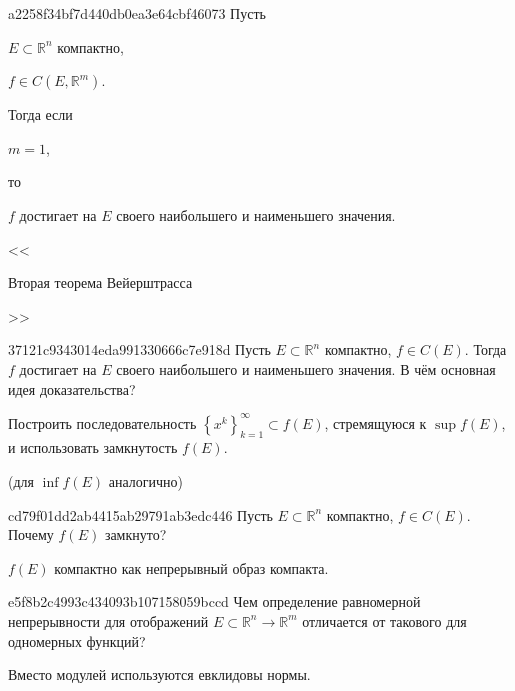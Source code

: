 \begin{note}{a2258f34bf7d440db0ea3e64cbf46073}
    Пусть \begin{icloze}{3}\({ E \subset \mathbb R^{n} }\) компактно,\end{icloze}\: \begin{icloze}{4}\({ f \in C(E, \mathbb R^{m}) }\).\end{icloze}
    Тогда если \begin{icloze}{2}\({ m = 1 }\),\end{icloze} то \begin{icloze}{1}\({ f }\) достигает на \({ E }\) своего наибольшего и наименьшего значения.\end{icloze}

    \begin{center}
        \tiny
        <<\begin{icloze}{5}Вторая теорема Вейерштрасса\end{icloze}>>
    \end{center}
\end{note}

\begin{note}{37121c9343014eda991330666c7e918d}
    Пусть \({ E \subset \mathbb R^{n} }\) компактно,\: \({ f \in C(E) }\).
    Тогда \({ f }\) достигает на \({ E }\) своего наибольшего и наименьшего значения.
    В чём основная идея доказательства?

    \begin{cloze}{1}
        Построить последовательность \({ \left\{ x^{k} \right\}_{k = 1}^{\infty} \subset f(E) }\), стремящуюся к \({ \sup f(E) }\), и использовать замкнутость \({ f(E) }\).

        \begin{center}
            \tiny
            (для \({ \inf f(E) }\) аналогично)
        \end{center}
    \end{cloze}
\end{note}

\begin{note}{cd79f01dd2ab4415ab29791ab3edc446}
    Пусть \({ E \subset \mathbb R^{n} }\) компактно,\: \({ f \in C(E) }\).
    Почему \({ f(E) }\) замкнуто?

    \begin{cloze}{1}
        \({ f(E) }\) компактно как непрерывный образ компакта.
    \end{cloze}
\end{note}

\begin{note}{e5f8b2c4993c434093b107158059bccd}
    Чем определение равномерной непрерывности для отображений \({ E \subset \mathbb R^{n} \to \mathbb R^{m} }\) отличается от такового для одномерных функций?

    \begin{cloze}{1}
        Вместо модулей используются евклидовы нормы.
    \end{cloze}
\end{note}

